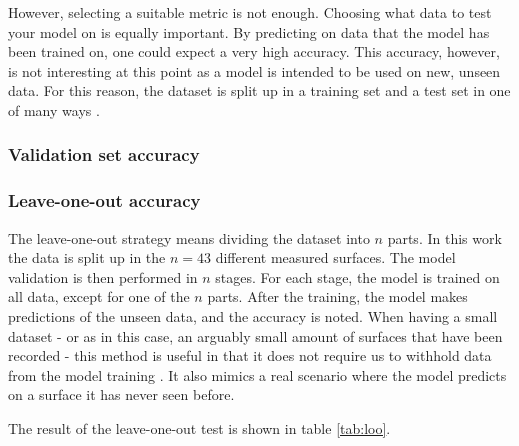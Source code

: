 However, selecting a suitable metric is not enough. Choosing what data to test your model on is equally important. By predicting on data that the model has been trained on, one could expect a very high accuracy. This accuracy, however, is not interesting at this point as a model is intended to be used on new, unseen data. For this reason, the dataset is split up in a training set and a test set in one of many ways \citep{raschka}.


\subsubsection{Validation set accuracy}



\subsubsection{Leave-one-out accuracy}
The leave-one-out strategy means dividing the dataset into $n$ parts. In this work the data is split up in the $n=43$ different measured surfaces. The model validation is then performed in $n$ stages. For each stage, the model is trained on all data, except for one of the $n$ parts. After the training, the model makes predictions of the unseen data, and the accuracy is noted. When having a small dataset - or as in this case, an arguably small amount of surfaces that have been recorded - this method is useful in that it does not require us to withhold data from the model training \citep{raschka}. It also mimics a real scenario where the model predicts on a surface it has never seen before.

The result of the leave-one-out test is shown in table \ref{tab:loo}.










